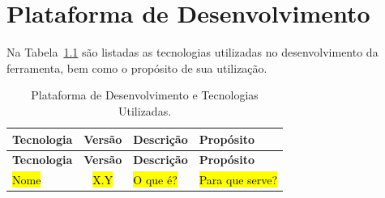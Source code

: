 \chapter{Plataforma de Desenvolvimento}
\label{sec-plataforma}
\vspace{-1cm}





Na Tabela~\ref{tabela-plataforma} são listadas as tecnologias utilizadas no desenvolvimento da ferramenta, bem como o propósito de sua utilização.

\begin{footnotesize}
\begin{longtable}{|p{2.5cm}|c|p{5cm}|p{5.5cm}|}
	\caption{Plataforma de Desenvolvimento e Tecnologias Utilizadas.}	
	\label{tabela-plataforma}\\\hline

	\rowcolor{lightgray}
	\textbf{Tecnologia} & \textbf{Versão} & \textbf{Descrição} & \textbf{Propósito} \\\hline 
	\endfirsthead
	\hline
	\rowcolor{lightgray}
	\textbf{Tecnologia} & \textbf{Versão} & \textbf{Descrição} & \textbf{Propósito} \\\hline 
	\endhead
		
	\hl{Nome} & \hl{X.Y} & \hl{O que é?} & \hl{Para que serve?} \\ \hline

\end{longtable}
\end{footnotesize}






